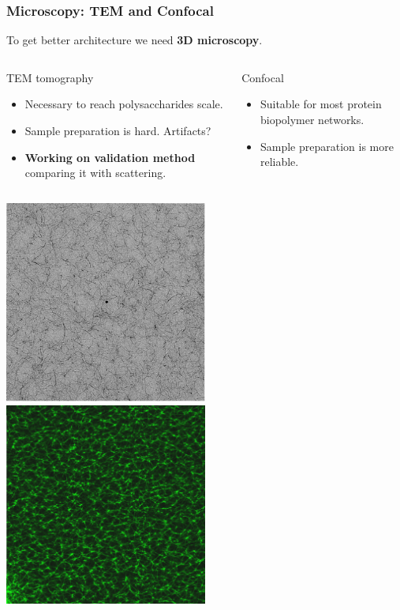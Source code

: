 \documentclass[10pt]{beamer}
\begin{document}
\begin{frame}
  \frametitle{Microscopy: TEM and Confocal}
  To get better architecture we need \textbf{3D microscopy}.
  \begin{columns}[T,onlytextwidth]
      \begin{exampleblock}{TEM tomography}
          \begin{itemize}
              \item Necessary to reach polysaccharides scale.
              \item Sample preparation is hard. Artifacts?
              \item \textbf{Working on validation method} comparing it with scattering.
          \end{itemize}
      \end{exampleblock}
      \begin{exampleblock}{Confocal}
          \begin{itemize}
              \item Suitable for most protein biopolymer networks.
              \item Sample preparation is more reliable.
          \end{itemize}
      \end{exampleblock}
  \end{columns}
  \begin{columns}[T,onlytextwidth]
      \centering\includegraphics[width=0.5\textwidth]{./Figures/image_tem.png}
      \centering\includegraphics[width=0.5\textwidth]{./Figures/image_confocal.png}
  \end{columns}
\end{frame}
\end{document}
